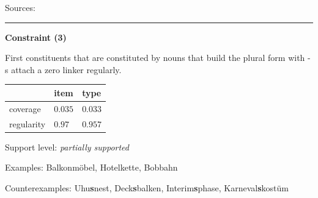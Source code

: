 \noindent
Sources: \citet[106]{ortner_mueller-bollhagen_1991}

\vspace{0.35em}
\hrule




\vspace{0.4em}

\begin{center}
\textbf{Constraint (3)}
\end{center}

\noindent
First constituents that are constituted by nouns that build the plural form with -s attach a zero linker regularly.
\vspace{0.5em}


\vspace{-0.25em}

\begin{table}[!ht]
\begin{center}
\setlength{\extrarowheight}{1pt}
\begin{tabularx}{\columnwidth}{|X|X|X|}
\hline
 & item & type \\
\hline
 coverage & $0.035$ & $0.033$ \\
\hline
 regularity & $0.97$ & $0.957$ \\
\hline
\end{tabularx}
\end{center}
\end{table}

\vspace{-1.35em}

\noindent
Support level: \textit{partially supported}

\vspace{0.3em}

\noindent
Examples: Balkon{\zeroLinker}möbel, Hotel{\zeroLinker}kette, Bob{\zeroLinker}bahn

\noindent
Counterexamples: Uhu\textbf{s}nest, Deck\textbf{s}balken, Interim\textbf{s}phase, Karneval\textbf{s}kostüm

